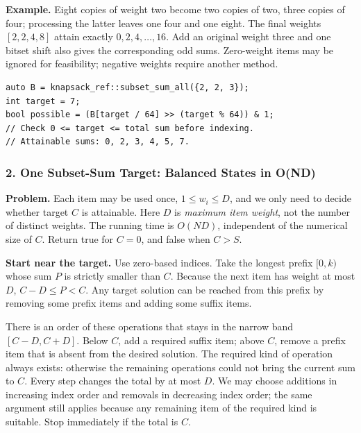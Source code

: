 \textbf{Example.} Eight copies of weight two become two copies of two,
three copies of four; processing the latter leaves one four and one
eight. The final weights $[2,2,4,8]$ attain exactly
$0,2,4,\ldots,16$. Add an original weight three and one bitset shift
also gives the corresponding odd sums. Zero-weight items may be
ignored for feasibility; negative weights require another method.

\begin{minipage}{\linewidth}
\begin{lstlisting}[style=C++,showstringspaces=false]
auto B = knapsack_ref::subset_sum_all({2, 2, 3});
int target = 7;
bool possible = (B[target / 64] >> (target % 64)) & 1;
// Check 0 <= target <= total sum before indexing.
// Attainable sums: 0, 2, 3, 4, 5, 7.
\end{lstlisting}
\end{minipage}
\par

\subsubsection{2. One Subset-Sum Target: Balanced States in O(ND)}
\textbf{Problem.} Each item may be used once, $1\le w_i\le D$, and we
only need to decide whether target $C$ is attainable. Here $D$ is
\emph{maximum item weight}, not the number of distinct weights.
The running time is $O(ND)$, independent of the numerical size of $C$.
Return true for $C=0$, and false when $C>S$.

\textbf{Start near the target.} Use zero-based indices. Take the
longest prefix $[0,k)$ whose sum $P$ is strictly smaller than $C$.
Because the next item has weight at most $D$, $C-D\le P<C$.
Any target solution can be reached from this prefix by removing some
prefix items and adding some suffix items.

There is an order of these operations that stays in the narrow band
$[C-D,C+D]$. Below $C$, add a required suffix item; above $C$, remove
a prefix item that is absent from the desired solution. The required
kind of operation always exists: otherwise the remaining operations
could not bring the current sum to $C$. Every step changes the total
by at most $D$. We may choose additions in increasing index order and
removals in decreasing index order; the same argument still applies
because any remaining item of the required kind is suitable.
Stop immediately if the total is $C$.

